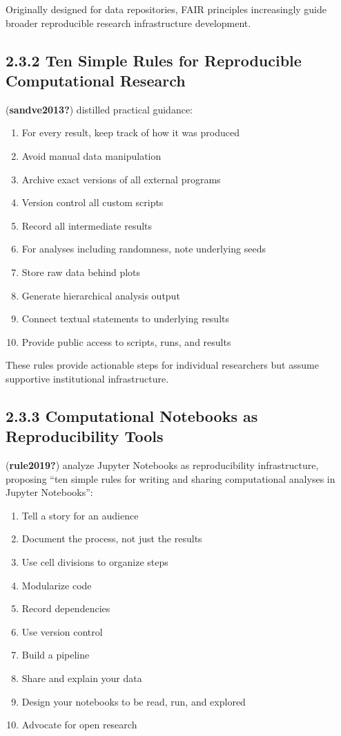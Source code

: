 \documentclass[
  oneside,
  open=any]{scrbook}
\providecommand{\tightlist}{%
  \setlength{\itemsep}{0pt}\setlength{\parskip}{0pt}}\usepackage{longtable,booktabs,array}
\begin{document}
Originally designed for data repositories, FAIR principles increasingly
guide broader reproducible research infrastructure development.

\subsection{2.3.2 Ten Simple Rules for Reproducible Computational
Research}\label{ten-simple-rules-for-reproducible-computational-research}

(\textbf{sandve2013?}) distilled practical guidance:

\begin{enumerate}
\def\labelenumi{\arabic{enumi}.}
\tightlist
\item
  For every result, keep track of how it was produced
\item
  Avoid manual data manipulation
\item
  Archive exact versions of all external programs
\item
  Version control all custom scripts
\item
  Record all intermediate results
\item
  For analyses including randomness, note underlying seeds
\item
  Store raw data behind plots
\item
  Generate hierarchical analysis output
\item
  Connect textual statements to underlying results
\item
  Provide public access to scripts, runs, and results
\end{enumerate}

These rules provide actionable steps for individual researchers but
assume supportive institutional infrastructure.

\subsection{2.3.3 Computational Notebooks as Reproducibility
Tools}\label{computational-notebooks-as-reproducibility-tools}

(\textbf{rule2019?}) analyze Jupyter Notebooks as reproducibility
infrastructure, proposing ``ten simple rules for writing and sharing
computational analyses in Jupyter Notebooks'':

\begin{enumerate}
\def\labelenumi{\arabic{enumi}.}
\tightlist
\item
  Tell a story for an audience
\item
  Document the process, not just the results
\item
  Use cell divisions to organize steps
\item
  Modularize code
\item
  Record dependencies
\item
  Use version control
\item
  Build a pipeline
\item
  Share and explain your data
\item
  Design your notebooks to be read, run, and explored
\item
  Advocate for open research
\end{enumerate}
\end{document}
